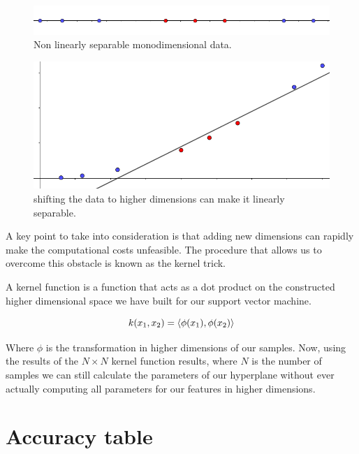 \documentclass[a4paper]{report}
\begin{document}
\begin{figure} [H]
    \centering
    \includegraphics [width=\textwidth ]{svm/1dim_ns.png}
    \caption{Non linearly separable monodimensional data.}
    \label{1dim_ns}
\end{figure}

\begin{figure} [H]
    \centering
    \includegraphics [width=\textwidth ]{svm/2dim.png}
    \caption{shifting the data to higher dimensions can make it linearly separable.}
    \label{2dim}
\end{figure}

A key point to take into consideration is that adding new dimensions can rapidly make the computational costs unfeasible. The procedure that allows us to overcome this obstacle is known as the kernel trick.

A kernel function is a function that acts as a dot product on the constructed higher dimensional space we have built for our support vector machine.

\begin{equation}
    k(x_1,x_2)= \braket{\phi (x_1),\phi (x_2)}
\end{equation}

Where $\phi$ is the transformation in higher dimensions of our samples. Now, using the results of the $N \times N$ kernel function results, where $N$ is the number of samples we can still calculate the parameters of our hyperplane without ever actually computing all parameters for our features in higher dimensions.

\section{Accuracy table}
\end{document}
